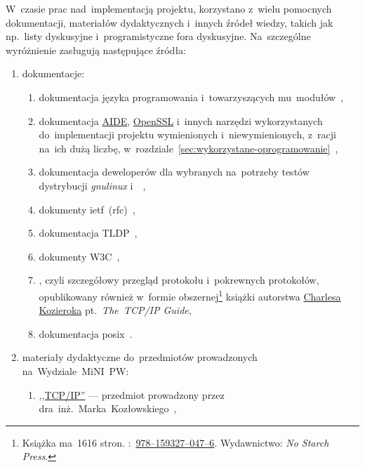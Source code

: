 \documentclass[thesis]{subfiles}
\begin{document}
W~czasie prac nad~implementacją projektu, korzystano z~wielu pomocnych dokumentacji, materiałów dydaktycznych i~innych źródeł wiedzy, takich jak np.~listy dyskusyjne i~programistyczne fora dyskusyjne. Na~szczególne wyróżnienie zasługują następujące źródła:\mynobreakpar
\begin{enumerate}
	\item dokumentacje:\mynobreakpar
	\begin{enumerate}
		\item dokumentacja języka programowania \python{} i~towarzyszących mu~modułów~\cite{python-doc},%
		\item dokumentacja \hyperref[sec:aide]{AIDE}, \href{https://en.wikipedia.org/wiki/OpenSSL}{OpenSSL} i~innych narzędzi wykorzystanych do~implementacji projektu wymienionych i~niewymienionych, z~racji na~ich dużą liczbę, w~rozdziale~\ref{sec:wykorzystane-oprogramowanie}~\cite{openssl-doc},
		\item dokumentacja deweloperów dla wybranych na~potrzeby testów dystrybucji \emph{\gls{gnulinux}}  i~~\cite{archlinux-wiki,debian-wiki},
		\item dokumenty \gls{ietf}~(\gls{rfc})~\cite{rfc-editor},
		\item dokumentacja TLDP~\cite{tldp},
		\item dokumenty W3C~\cite{w3c},
		\item {}, czyli szczegółowy przegląd protokołu  i~pokrewnych protokołów, opublikowany również w~formie obszernej\footnote{Książka ma~1616 stron. \isbn{}:~\href{https://www.nostarch.com/tcpip.htm}{978--159327--047--6}. Wydawnictwo: \emph{No Starch Press}.} książki autorstwa \href{https://www.linkedin.com/in/charles-kozierok-708112/}{\mbox{Charlesa} \mbox{Kozieroka}} pt.~\emph{The~TCP/IP Guide},
		\item dokumentacja \gls{posix}~\cite{posix}.
	\end{enumerate}
	\item materiały dydaktyczne do~przedmiotów prowadzonych na~Wydziale~MiNI~PW:\mynobreakpar
	\begin{enumerate}
		\item \href{http://www.mini.pw.edu.pl/~kozlowsm/tcpip}{,,TCP/IP''} --- przedmiot prowadzony przez dra~inż.~Marka~Kozłowskiego~\cite{kozlowski},

\end{enumerate}
\end{enumerate}
\end{document}
